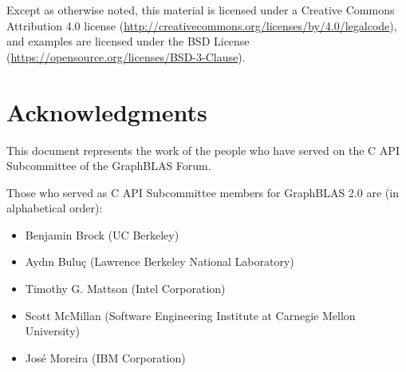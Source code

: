 \documentclass[11pt]{extbook}
\begin{document}


\vspace{1.5cm}



Except as otherwise noted, this material is licensed under a Creative Commons Attribution 4.0 license (\href{http://creativecommons.org/licenses/by/4.0/legalcode}{http://creativecommons.org/licenses/by/4.0/legalcode}), 
and examples are licensed under the BSD License (\href{https://opensource.org/licenses/BSD-3-Clause}{https://opensource.org/licenses/BSD-3-Clause}).


\vfill

\pagebreak
\tableofcontents
\vfill
\pagebreak


{}
\listoftables
\vfill
\newpage

{}
\listoffigures
\vfill
\newpage


{}
\section*{Acknowledgments}

This document represents the work of the people who have served on the C API
Subcommittee of the GraphBLAS Forum.

Those who served as C API Subcommittee members for GraphBLAS 2.0 are (in alphabetical order):
\begin{itemize}
\item Benjamin Brock (UC Berkeley)
\item Ayd\i n Bulu\c{c} (Lawrence Berkeley National Laboratory)
\item Timothy G. Mattson (Intel Corporation)
\item Scott McMillan (Software Engineering Institute at Carnegie Mellon University)
\item Jos\'e Moreira (IBM Corporation)
\end{itemize}
\end{document}
